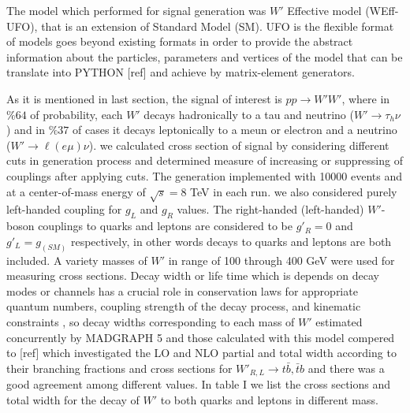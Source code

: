 The model which performed for signal generation was $W'$ Effective model {\small (WEff-UFO)}, that is an extension of Standard Model {\small (SM)}. {\small UFO} is the flexible format of models goes beyond existing formats in order to provide the abstract information about the particles, parameters and vertices of the model that can be translate into {\small PYTHON} [ref] and achieve by matrix-element generators. 

As it is mentioned in last section, the signal of interest is $ pp\rightarrow { W' W'} $, where in $\%64$ of probability, each $ W'$ decays hadronically to a tau and neutrino ($ W' \rightarrow \tau_{h} \nu $) and in $\%37$ of cases it decays leptonically to a meun or electron and a neutrino ($ W' \rightarrow \ell(e\mu) \nu  $). we calculated cross section of signal by considering different cuts in generation process and determined measure of increasing or suppressing of couplings after applying cuts. The generation implemented with 10000 events and at a center-of-mass energy of $ \sqrt{s}=8 $ TeV in each run. we also considered purely left-handed coupling  for $ g_L $ and $ g_R $ values.  The right-handed (left-handed) $W'$-boson couplings to quarks and leptons are considered to be $g'_R = 0$ and $g'_L = g_{(SM)}$ respectively, in other words decays to quarks and leptons are both included. A variety masses of $W'$ in range of 100 through 400 GeV were used for measuring cross sections.  Decay width or life time which is depends on decay modes or channels has a crucial role in conservation laws for appropriate quantum numbers, coupling strength of the decay process, and kinematic constraints , so decay widths corresponding to each mass of $ W' $ estimated concurrently by {\small MADGRAPH 5} and those calculated with this model compered to [ref] which investigated the LO and NLO partial and total width according to their branching fractions and cross sections for  $ W'_{R,L}\rightarrow t \bar{b},\bar{t}b $  and there was a good agreement among different values.  In table I we list the cross sections and total width for the decay of $ W' $ to both quarks and leptons in different mass. 

